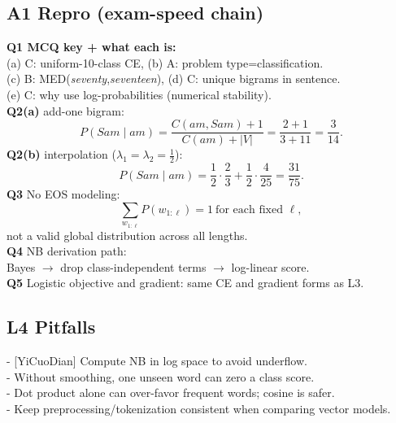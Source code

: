 \subsection*{A1 Repro (exam-speed chain)}
\textbf{Q1 MCQ key + what each is:}\\
(a) C: uniform-10-class CE, (b) A: problem type=classification.\\
(c) B: MED(\textit{seventy},\textit{seventeen}), (d) C: unique bigrams in sentence.\\
(e) C: why use log-probabilities (numerical stability).\\
\textbf{Q2(a)} add-one bigram:
\[
P(Sam\mid am)=
\frac{C(am,Sam)+1}{C(am)+|V|}
=\frac{2+1}{3+11}=\frac{3}{14}.
\]
\textbf{Q2(b)} interpolation ($\lambda_1=\lambda_2=\frac{1}{2}$):
\[
P(Sam\mid am)=
\frac{1}{2}\cdot\frac{2}{3}
+\frac{1}{2}\cdot\frac{4}{25}
=\frac{31}{75}.
\]
\textbf{Q3} No EOS modeling:
\[
\sum_{w_{1:\ell}}P(w_{1:\ell})=1\ \text{for each fixed }\ell,
\]
not a valid global distribution across all lengths.\\
\textbf{Q4} NB derivation path:\\
Bayes $\rightarrow$ drop class-independent terms $\rightarrow$ log-linear score.\\
\textbf{Q5} Logistic objective and gradient: same CE and gradient forms as L3.

\subsection*{L4 Pitfalls}
- [YiCuoDian] Compute NB in log space to avoid underflow.\\
- Without smoothing, one unseen word can zero a class score.\\
- Dot product alone can over-favor frequent words; cosine is safer.\\
- Keep preprocessing/tokenization consistent when comparing vector models.
